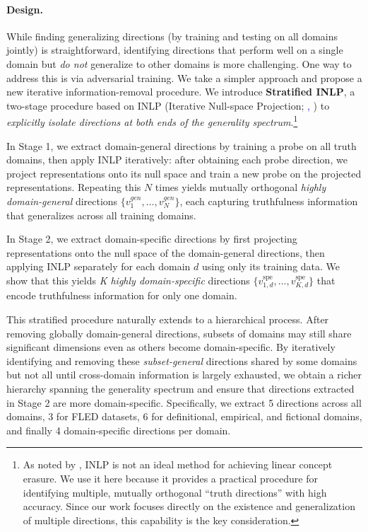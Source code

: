 \documentclass{article}
\theoremstyle{plain}
\theoremstyle{definition}
\theoremstyle{remark}
\begin{document}
\paragraph{Design.} While finding generalizing directions (by training and testing on all domains jointly) is straightforward, identifying directions that perform well on a single domain but \emph{do not} generalize to other domains is more challenging. One way to address this is via adversarial training. We take a simpler approach and propose a new iterative information-removal procedure. We introduce \textbf{Stratified INLP}, a two-stage procedure based on INLP 
(Iterative Null-space Projection; 
\textcolor{blue}{\citeauthor{ravfogel2020null}, \citeyear{ravfogel2020null}})
to \textit{explicitly isolate directions at both ends of the generality spectrum}.\footnote{As noted by \citet{belrose2023leace}, INLP is not an ideal method for achieving linear concept erasure. We use it here because it provides a practical procedure for identifying multiple, mutually orthogonal ``truth directions'' with high accuracy. Since our work focuses directly on the existence and generalization of multiple directions, this capability is the key consideration.}

In Stage 1, we extract domain-general directions by training a probe on all truth domains, then apply INLP iteratively: after obtaining each probe direction, we project representations onto its null space and train a new probe on the projected representations. Repeating this $N$ times yields mutually orthogonal \textit{highly domain-general} directions $\{v_1^{gen}, \ldots, v_N^{gen}\}$, each capturing truthfulness information that generalizes across all training domains. 

In Stage 2, we extract domain-specific directions by first projecting representations onto the null space of the domain-general directions, then applying INLP separately for each domain $d$ using only its training data. We show that this yields \textit{K highly domain-specific} directions $\{v_{1,d}^{\text{spe}}, \ldots, v_{K,d}^{\text{spe}}\}$ that encode truthfulness information for only one domain. 

This stratified procedure naturally extends to a hierarchical process. After removing globally domain-general directions, subsets of domains may still share significant dimensions even as others become domain-specific. By iteratively identifying and removing these \textit{subset-general} directions shared by some domains but not all until cross-domain information is largely exhausted, we obtain a richer hierarchy spanning the generality spectrum and ensure that directions extracted in Stage 2 are more domain-specific. Specifically, we extract 5 directions across all domains, 3 for FLED datasets, 6 for definitional, empirical, and fictional domains, and finally 4 domain-specific directions per domain.
\end{document}
